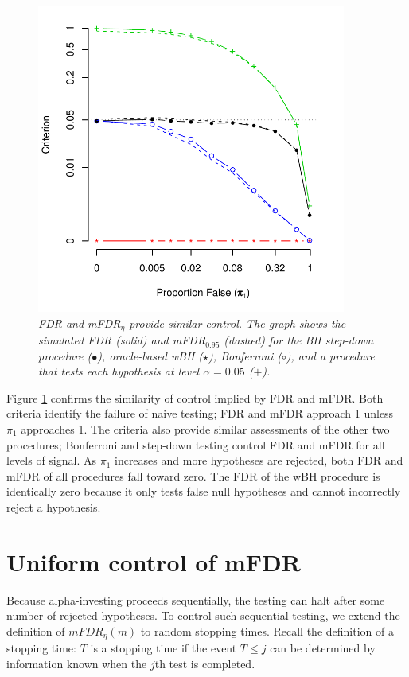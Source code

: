 \documentclass[12pt]{article}
\newcommand{\al}{\alpha}
\begin{document}
\begin{figure}
\caption{    \label{fi:fig1} \sl
FDR  and mFDR${}_\eta$ provide similar control. The graph shows the
simulated FDR (solid) and mFDR${}_{0.95}$ (dashed) for the
BH step-down procedure ($\bullet$), oracle-based wBH ($\star$),
Bonferroni ($\circ$), 
and a procedure that tests each hypothesis at level $\al=0.05$ ($+$).
}
\vspace*{-0.025in}
\centerline{      \includegraphics[width=4in]{figure1}  }
\end{figure}


Figure \ref{fi:fig1} confirms the similarity of control implied by FDR and mFDR.   
Both criteria identify the failure of naive testing; FDR and mFDR
 approach 1 unless $\pi_1$ approaches 1.  
The criteria also provide similar assessments of the other
 two procedures; Bonferroni and step-down testing control 
 FDR and mFDR for all levels of signal.  As $\pi_1$ increases and 
 more hypotheses are rejected, both FDR and mFDR of all procedures fall toward zero.   
 The FDR of the wBH procedure is identically zero because it
  only tests false null hypotheses and cannot incorrectly reject a hypothesis.

\section{Uniform control of mFDR}      \label{sec:sFDR}    %

Because alpha-investing proceeds sequentially, the testing can
 halt after some number of rejected hypotheses. To control such
 sequential testing, we extend the definition of $mFDR_\eta(m)$ 
 to random stopping times.  
 Recall the definition of a stopping time: $T$ is a stopping  time
  if the event $T \le j$ can be determined by information known 
  when the $j$th test is completed.  
\end{document}
